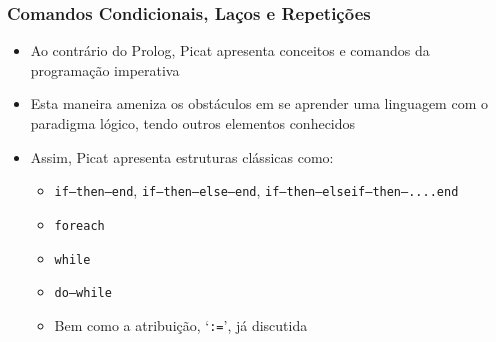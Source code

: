 \begin{frame}[fragile]
\frametitle{Comandos Condicionais, Laços e Repetições}
    
  
  \begin{itemize}
      
      \item Ao contrário do Prolog, Picat apresenta
      conceitos e comandos da programação imperativa
      
      \pause
      \item Esta maneira  ameniza os obstáculos
      em se aprender uma linguagem com o paradigma lógico,
      tendo outros elementos conhecidos
  
          \pause
      \item Assim, Picat apresenta estruturas clássicas
      como: 
      \begin{itemize}
        \item  \texttt{if--then--end}, \texttt{if--then--else--end}, \texttt{if--then--elseif--then--....end}
        \item  \texttt{foreach}
        \item  \texttt{while}
        \item  \texttt{do--while}
        \item Bem como a atribuição, `\texttt{:=}', já discutida
      \end{itemize}
   \end{itemize}

       
\end{frame}    
     
    
    
